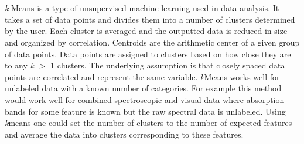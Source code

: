\documentclass[titlepage]{article}
\begin{document}
\newpage

\section{}
\setlength{\parindent}{20pt}
\par \emph{k}-Means is a type of unsupervised machine learning used in data analysis. 
It takes a set of data points and divides them into a number of clusters 
determined by the user. Each cluster is averaged and the outputted data is 
reduced in size and organized by correlation. Centroids are the arithmetic center 
of a given group of data points. Data points are assigned to clusters based on 
how close they are to any \emph{k} $>$ 1 clusters. The underlying assumption is that closely spaced 
data points are correlated and represent the same variable. \emph{k}Means works well for unlabeled data 
with a known number of categories. For example this method would work well for combined spectroscopic 
and visual data where absorption bands for some feature is known but the raw spectral data is unlabeled. 
Using \emph{k}means one could set the number of clusters to the number of expected features and average the data 
into clusters corresponding to these features. 

\section{}
\setlength{\parindent}{20pt}
    
\end{document}
